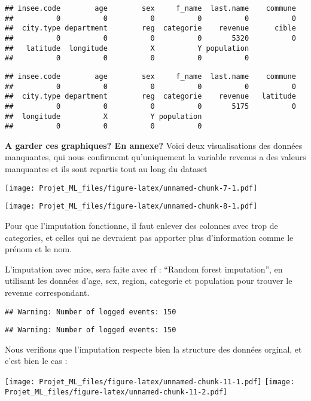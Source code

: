 \documentclass[]{article}
\begin{document}
\begin{verbatim}
## insee.code        age        sex     f_name  last.name    commune 
##          0          0          0          0          0          0 
##  city.type department        reg  categorie    revenue      cible 
##          0          0          0          0       5320          0 
##   latitude  longitude          X          Y population 
##          0          0          0          0          0
\end{verbatim}

\begin{verbatim}
## insee.code        age        sex     f_name  last.name    commune 
##          0          0          0          0          0          0 
##  city.type department        reg  categorie    revenue   latitude 
##          0          0          0          0       5175          0 
##  longitude          X          Y population 
##          0          0          0          0
\end{verbatim}

\textbf{A garder ces graphiques? En annexe?} Voici deux visualisations
des données manquantes, qui nous confirmemt qu'uniquement la variable
revenus a des valeurs manquantes et ils sont repartis tout au long du
dataset

\texttt{[image: Projet\_ML\_files/figure-latex/unnamed-chunk-7-1.pdf]}

\texttt{[image: Projet\_ML\_files/figure-latex/unnamed-chunk-8-1.pdf]}

Pour que l'imputation fonctionne, il faut enlever des colonnes avec trop
de categories, et celles qui ne devraient pas apporter plus
d'information comme le prénom et le nom.

L'imputation avec mice, sera faite avec rf : ``Random forest
imputation'', en utilisant les données d'age, sex, region, categorie et
population pour trouver le revenue correspondant.

\begin{verbatim}
## Warning: Number of logged events: 150
\end{verbatim}

\begin{verbatim}
## Warning: Number of logged events: 150
\end{verbatim}

Nous verifions que l'imputation respecte bien la structure des données
orginal, et c'est bien le cas :

\texttt{[image: Projet\_ML\_files/figure-latex/unnamed-chunk-11-1.pdf]}
\texttt{[image: Projet\_ML\_files/figure-latex/unnamed-chunk-11-2.pdf]}
\end{document}
